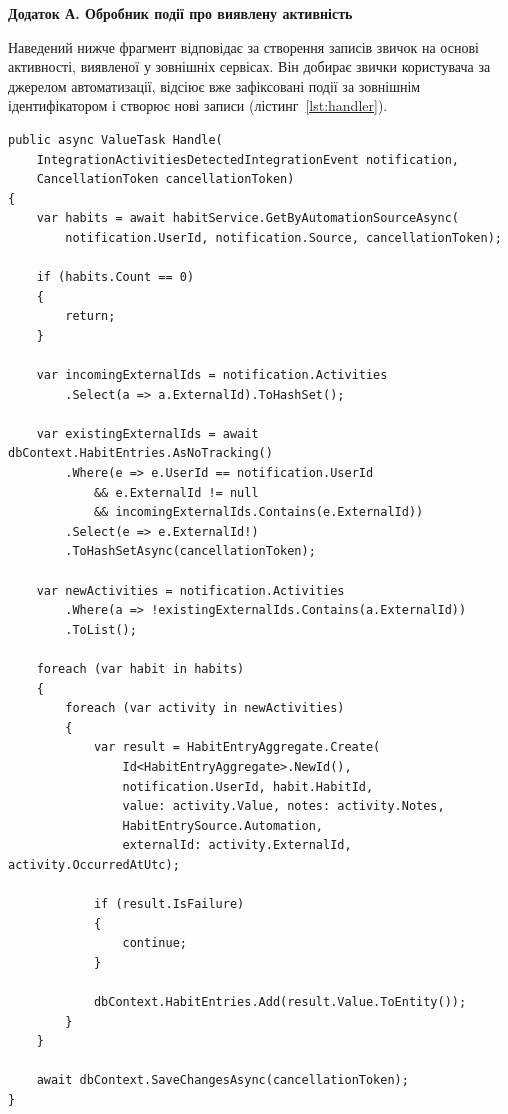 
\vspace{1em}
\noindent\textbf{Додаток А. Обробник події про виявлену активність}

\vspace{0.5em}
Наведений нижче фрагмент відповідає за створення записів звичок на основі активності, виявленої у зовнішніх сервісах. Він добирає звички користувача за джерелом автоматизації, відсіює вже зафіксовані події за зовнішнім ідентифікатором і створює нові записи (лістинг~\ref{lst:handler}).

\begin{lstlisting}[style=nocodeframe, caption={Створення записів за виявленою активністю}, label={lst:handler}]
public async ValueTask Handle(
    IntegrationActivitiesDetectedIntegrationEvent notification,
    CancellationToken cancellationToken)
{
    var habits = await habitService.GetByAutomationSourceAsync(
        notification.UserId, notification.Source, cancellationToken);

    if (habits.Count == 0)
    {
        return;
    }

    var incomingExternalIds = notification.Activities
        .Select(a => a.ExternalId).ToHashSet();

    var existingExternalIds = await dbContext.HabitEntries.AsNoTracking()
        .Where(e => e.UserId == notification.UserId
            && e.ExternalId != null
            && incomingExternalIds.Contains(e.ExternalId))
        .Select(e => e.ExternalId!)
        .ToHashSetAsync(cancellationToken);

    var newActivities = notification.Activities
        .Where(a => !existingExternalIds.Contains(a.ExternalId))
        .ToList();

    foreach (var habit in habits)
    {
        foreach (var activity in newActivities)
        {
            var result = HabitEntryAggregate.Create(
                Id<HabitEntryAggregate>.NewId(),
                notification.UserId, habit.HabitId,
                value: activity.Value, notes: activity.Notes,
                HabitEntrySource.Automation,
                externalId: activity.ExternalId, activity.OccurredAtUtc);

            if (result.IsFailure)
            {
                continue;
            }

            dbContext.HabitEntries.Add(result.Value.ToEntity());
        }
    }

    await dbContext.SaveChangesAsync(cancellationToken);
}
\end{lstlisting}

